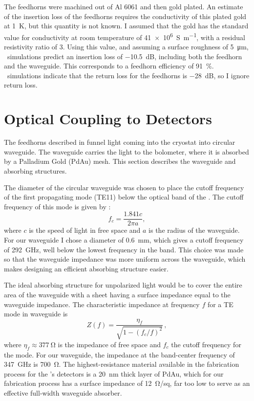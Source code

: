 The feedhorns were machined out of Al 6061 and then gold plated.
An estimate of the insertion loss of the feedhorns requires the conductivity of this plated gold at \SI{1}{\K}, but this quantity is not known.
I assumed that the gold has the standard value for conductivity at room temperature of \SI{41e6}{S\per\m}, with a residual resistivity ratio of 3.
Using this value, and assuming a surface roughness of \SI{5}{\um}, \HFSS\ simulations predict an insertion loss of \SI{-10.5}{\dB}, including both the feedhorn and the waveguide.
This corresponds to a feedhorn efficiency of \SI{91}{\percent}.
\HFSS\ simulations indicate that the return loss for the feedhorns is \SI{-28}{\dB}, so I ignore return loss.

\section{Optical Coupling to Detectors} \label{sec:ch4-coupling}

The feedhorns described in  funnel light coming into the cryostat into circular waveguide.
The waveguide carries the light to the bolometer, where it is absorbed by a Palladium Gold (PdAu) mesh.
This section describes the waveguide and absorbing structures.

The diameter of the circular waveguide was chosen to place the cutoff frequency of the first propagating mode (TE11) below the optical band of the \Imager.
The cutoff frequency of this mode is given by \cite[Chapter~5]{harrington_time-harmonic_2001}:
\begin{equation} \label{eqn:ch4-te11-cutoff}
  f_c = \frac{1.841 c}{2 \pi a },
\end{equation}
where $c$ is the speed of light in free space and $a$ is the radius of the waveguide.
For our waveguide I chose a diameter of \SI{0.6}{\mm}, which gives a cutoff frequency of \SI{292}{\GHz}, well below the lowest frequency in the band.
This choice was made so that the waveguide impedance was more uniform across the waveguide, which makes designing an efficient absorbing structure easier.

The ideal absorbing structure for unpolarized light would be to cover the entire area of the waveguide with a sheet having a surface impedance equal to the waveguide impedance.
The characteristic impedance at frequency $f$ for a TE mode in waveguide is \cite[Chapter~2]{harrington_time-harmonic_2001}
\begin{equation} \label{eqn:ch4-wg-imp}
  Z (f) = \frac{\eta_f}{\sqrt{1 - (f_c/f)^2}}\,,
\end{equation}
where $\eta_f \approx \SI{377}{\ohm}$ is the impedance of free space and $f_c$ the cutoff frequency for the mode.
For our waveguide, the impedance at the band-center frequency of \SI{347}{\GHz} is \SI{700}{\ohm}.
The highest-resistance material available in the fabrication process for the \Imager's detectors is a \SI{20}{\nm} thick layer of PdAu, which for our fabrication process has a surface impedance of \SI{12}{\ohm}/sq, far too low to serve as an effective full-width waveguide absorber.

